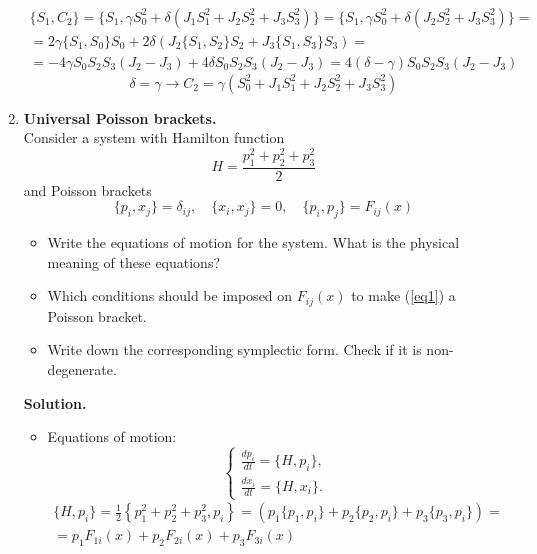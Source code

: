\documentclass[12pt]{article}
\theoremstyle{definition}
\begin{document}
\begin{enumerate}
\begin{multline}
    \end{multline}
    \begin{multline}
        \{S_1,C_2\}=\{S_1,\gamma S_0^2+\delta(J_1S_1^2+J_2S_2^2+J_3S_3^2)\}=\{S_1,\gamma S_0^2+\delta(J_2S_2^2+J_3S_3^2)\}=\\=2\gamma\{S_1,S_0\}S_0+2\delta(J_2\{S_1,S_2\}S_2+J_3\{S_1,S_3\}S_3)=\\=-4\gamma S_0S_2S_3(J_2-J_3)+4\delta S_0S_2S_3(J_2-J_3)=4(\delta-\gamma) S_0S_2S_3(J_2-J_3)
    \end{multline}
    \begin{equation}
        \boxed{\delta=\gamma\rightarrow C_2=\gamma(S_0^2+J_1S_1^2+J_2S_2^2+J_3S_3^2)}
    \end{equation}
    \item \textbf{Universal Poisson brackets.}\\
    Consider a system with Hamilton function
    \begin{equation}
        H=\frac{p_1^2+p_2^2+p_3^2}{2}
    \end{equation}
    and Poisson brackets
    \begin{equation}\label{eq1}
        \{p_i,x_j\}=\delta_{ij},\quad\{x_i,x_j\}=0,\quad \{p_i,p_j\}=F_{ij}(x)
    \end{equation}
    \begin{itemize}
        \item Write the equations of motion for the system. What is the physical meaning of these equations?
        \item Which conditions should be imposed on $F_{ij}(x)$ to make (\ref{eq1}) a Poisson bracket.
        \item Write down the corresponding symplectic form. Check if it is non-degenerate.
    \end{itemize}
    \textbf{Solution.}
    \begin{itemize}
        \item Equations of motion:
        \begin{equation}
            \begin{cases}
                \frac{dp_i}{dt}=\{H,p_i\},\\
                \frac{dx_i}{dt}=\{H,x_i\}.
            \end{cases}
        \end{equation}
        \begin{align}
            \{H,p_i\}=\frac{1}{2}\left\{p_1^2+p_2^2+p_3^2,p_i\right\}=(p_1\{p_1,p_i\}+p_2\{p_2,p_i\}+p_3\{p_3,p_i\})=\\=p_1F_{1i}(x)+p_2F_{2i}(x)+p_3F_{3i}(x)

\end{align}
\end{itemize}
\end{enumerate}
\end{document}
